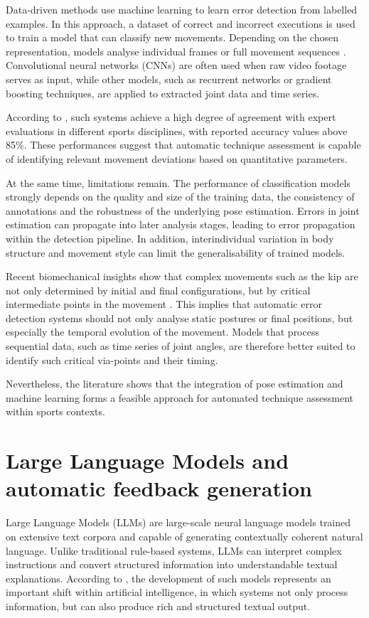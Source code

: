 Data-driven methods use machine learning to learn error detection from labelled examples. In this approach, a dataset of correct and incorrect executions is used to train a model that can classify new movements. Depending on the chosen representation, models analyse individual frames or full movement sequences \autocite{Souaifi2025}. Convolutional neural networks (CNNs) are often used when raw video footage serves as input, while other models, such as recurrent networks or gradient boosting techniques, are applied to extracted joint data and time series.

According to \textcite{Souaifi2025}, such systems achieve a high degree of agreement with expert evaluations in different sports disciplines, with reported accuracy values above 85\%. These performances suggest that automatic technique assessment is capable of identifying relevant movement deviations based on quantitative parameters.

At the same time, limitations remain. The performance of classification models strongly depends on the quality and size of the training data, the consistency of annotations and the robustness of the underlying pose estimation. Errors in joint estimation can propagate into later analysis stages, leading to error propagation within the detection pipeline. In addition, interindividual variation in body structure and movement style can limit the generalisability of trained models.

Recent biomechanical insights show that complex movements such as the kip are not only determined by initial and final configurations, but by critical intermediate points in the movement \autocite{Yamasaki2010}. This implies that automatic error detection systems should not only analyse static postures or final positions, but especially the temporal evolution of the movement. Models that process sequential data, such as time series of joint angles, are therefore better suited to identify such critical via-points and their timing.

Nevertheless, the literature shows that the integration of pose estimation and machine learning forms a feasible approach for automated technique assessment within sports contexts.

\section{Large Language Models and automatic feedback generation}
\label{sec:LLM-feedback}
Large Language Models (LLMs) are large-scale neural language models trained on extensive text corpora and capable of generating contextually coherent natural language. Unlike traditional rule-based systems, LLMs can interpret complex instructions and convert structured information into understandable textual explanations. According to \textcite{He2026}, the development of such models represents an important shift within artificial intelligence, in which systems not only process information, but can also produce rich and structured textual output.

